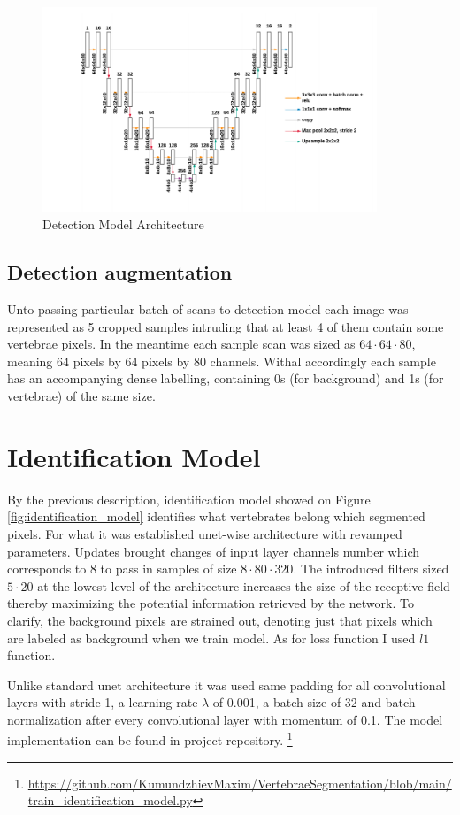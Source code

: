 \begin{figure}[h]
    \centering \includegraphics[width=10cm]{images/detection_model.png}
    \caption {Detection Model Architecture}
    \label{fig:detection_model}
\end{figure}
 
\subsection{Detection augmentation}
Unto passing particular batch of scans to detection model each image was represented as 5 cropped samples intruding that at least 4 of them contain some vertebrae pixels. In the meantime each sample scan was sized as $64 \cdot 64 \cdot 80$, meaning 64 pixels by 64 pixels by 80 channels. Withal accordingly each sample has an accompanying dense labelling, containing 0s (for background) and 1s (for vertebrae) of the same size.    
 
\section{Identification Model}
By the previous description, identification model showed on Figure \ref{fig:identification_model} identifies what vertebrates belong which segmented pixels. For what it was established unet-wise architecture with revamped parameters. Updates brought changes of input layer channels number which corresponds to 8 to pass in samples of size $8 \cdot 80 \cdot 320$. The introduced filters sized $5 \cdot 20$ at the lowest level of the architecture  increases the size of the receptive field thereby maximizing the potential information retrieved by the network. To clarify, the background pixels are strained out, denoting just that pixels which are labeled as background when we train model. As for loss function I used $l1$ function.

Unlike standard unet architecture it was used same padding for all convolutional layers with stride 1, a learning rate
$\lambda$ of 0.001, a batch size of 32 and batch normalization after every convolutional layer with momentum of 0.1. The model implementation can be found in project repository. \footnote{\url{https://github.com/KumundzhievMaxim/VertebraeSegmentation/blob/main/train_identification_model.py}}

